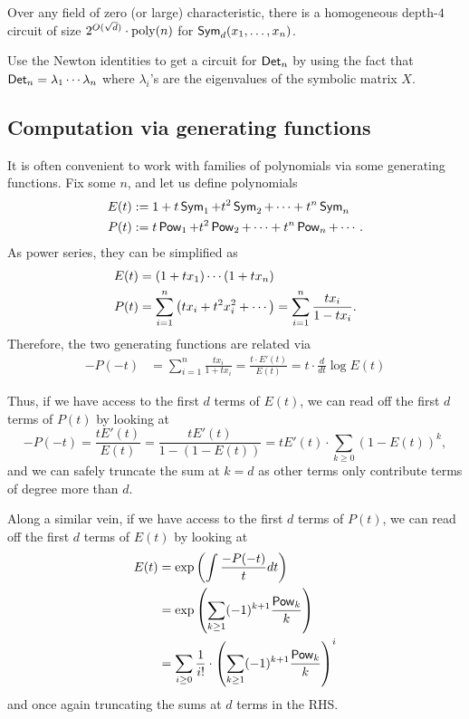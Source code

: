 \begin{lemma}\label{lem:hom-d4-ckt-esym}
Over any field of zero (or large) characteristic, there is a homogeneous depth-$4$ circuit of size $2^{O(\sqrt{d})} \cdot \operatorname{poly}(n)$ for $\operatorname{\mathsf{Sym}}_d(x_1,\ldots, x_n)$. 
\end{lemma}

\begin{exercise}
Use the Newton identities to get a circuit for $\operatorname{\mathsf{Det}}_n$ by using the fact that $\operatorname{\mathsf{Det}}_n = \lambda_1 \cdots \lambda_n$ where $\lambda_i$'s are the eigenvalues of the symbolic matrix $X$. 
\end{exercise}

\subsection{Computation via generating functions}

It is often convenient to work with families of polynomials via some generating functions. Fix some $n$, and let us define polynomials
\begin{align*}
E(t) & := 1 + t \operatorname{\mathsf{Sym}}_1 + t^2 \operatorname{\mathsf{Sym}}_2 + \cdots + t^n \operatorname{\mathsf{Sym}}_n\\
P(t) & := t \operatorname{\mathsf{Pow}}_1 + t^2 \operatorname{\mathsf{Pow}}_2 + \cdots + t^n \operatorname{\mathsf{Pow}}_n + \cdots .
\end{align*}
As power series, they can be simplified as 
\begin{align*}
E(t) & = (1 + tx_1) \cdots (1 + tx_n)\\
P(t) & = \sum_{i=1}^n \left(t x_i + t^2 x_i^2 + \cdots \right) = \sum_{i=1}^n \frac{tx_i}{1 - tx_i}.
\end{align*}
Therefore, the two generating functions are related via 
\begin{align*}
-P(-t) & = \sum_{i=1}^n \frac{tx_i}{1 + tx_i} = \frac{t \cdot E'(t)}{E(t)} = t \cdot \frac{d}{dt}\log E(t)
\end{align*}

\noindent
Thus, if we have access to the first $d$ terms of $E(t)$, we can read off the first $d$ terms of $P(t)$ by looking at 
\[
-P(-t) = \frac{t E'(t)}{E(t)} = \frac{t E'(t)}{1 - (1 - E(t))} = t E'(t) \cdot \sum_{k \geq 0} (1 - E(t))^k,
\]
and we can safely truncate the sum at $k = d$ as other terms only contribute terms of degree more than $d$. 

Along a similar vein, if we have access to the first $d$ terms of $P(t)$, we can read off the first $d$ terms of $E(t)$ by looking at 
\begin{align*}
E(t) & = \exp\left(\int \frac{-P(-t)}{t} dt\right) \\
     & = \exp\left(\sum_{k\geq 1} (-1)^{k+1} \frac{\operatorname{\mathsf{Pow}}_k}{k}\right)\\
     & = \sum_{i\geq 0} \frac{1}{i!} \cdot \left(\sum_{k\geq 1} (-1)^{k+1} \frac{\operatorname{\mathsf{Pow}}_k}{k}\right)^i
\end{align*}
and once again truncating the sums at $d$ terms in the RHS. 

